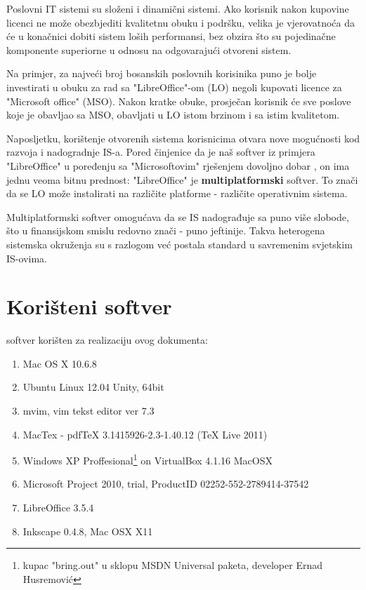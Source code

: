 \documentclass[times, utf8, seminar]{fit}
\begin{document}
Poslovni IT sistemi su složeni i dinamični sistemi. Ako korisnik nakon kupovine licenci ne može obezbjediti kvalitetnu obuku i podršku, velika je vjerovatnoća da će u konačnici dobiti sistem loših performansi, bez obzira što su pojedinačne komponente superiorne u odnosu na odgovarajući otvoreni sistem.

Na primjer, za najveći broj bosanskih poslovnih korisinika puno je bolje investirati u obuku za rad sa "LibreOffice"-om (LO) negoli kupovati licence za "Microsoft office" (MSO). Nakon kratke obuke, prosječan korisnik će sve poslove koje je obavljao sa MSO, obavljati u LO istom brzinom i sa istim kvalitetom.

Naposljetku, korištenje otvorenih sistema korisnicima otvara nove mogućnosti kod razvoja i nadogradnje IS-a.
Pored činjenice da je naš softver iz primjera "LibreOffice" u poređenju sa "Microsoftovim" rješenjem dovoljno dobar , on ima jednu veoma bitnu prednost: "LibreOffice" je \textbf{multiplatformski} softver. To znači da se LO može instalirati na različite platforme - različite operativnim sistema.

Multiplatformski softver omogućava da se IS nadograđuje sa puno više slobode, što u finansijskom smislu redovno znači - puno jeftinije. Takva heterogena sistemska okruženja su s razlogom već postala standard u savremenim svjetskim IS-ovima.  




\appendix

\chapter{Korišteni softver}
softver korišten za realizaciju ovog dokumenta:
\begin{enumerate}
  \item Mac OS X 10.6.8
  \item Ubuntu Linux 12.04 Unity, 64bit
  \item mvim, vim tekst editor ver 7.3
  \item MacTex - pdfTeX 3.1415926-2.3-1.40.12 (TeX Live 2011)
  \item Windows XP Proffesional\footnote{kupac "bring.out" u sklopu MSDN Universal paketa, developer Ernad Husremović} on VirtualBox 4.1.16 MacOSX 
  \item Microsoft Project 2010, trial, ProductID 02252-552-2789414-37542
  \item LibreOffice 3.5.4
  \item Inkscape 0.4.8, Mac OSX X11
\end{enumerate}
\end{document}
